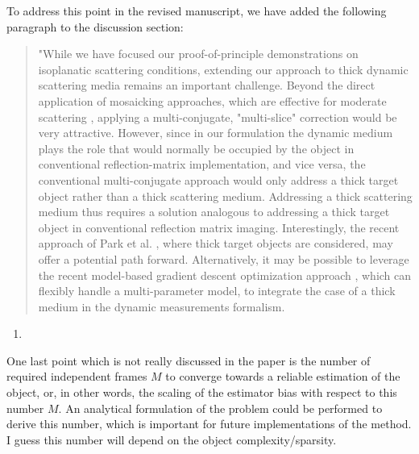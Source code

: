 \documentclass[12pt]{article}
\newenvironment{solved_reviewercomment}
    {\begin{tcolorbox}[width=\linewidth,colback=gray!5,colframe=solved_commentcolor!50,title=Reviewer Comment,left=5pt,right=5pt]}
    {\end{tcolorbox}}
\newenvironment{ourresponse}
    {\begin{tcolorbox}[width=\linewidth,breakable,enhanced,colback=gray!5,colframe=responsecolor!50,title=Response,left=5pt,right=5pt]}
    {\end{tcolorbox}}
\begin{document}
\begin{ourresponse}
    To address this point in the revised manuscript, we have added the following paragraph to the discussion section:
    \begin{quote}
        "While we have focused our proof-of-principle demonstrations on isoplanatic scattering conditions, extending our approach to thick dynamic scattering media remains an important challenge. Beyond the direct application of mosaicking approaches, which are effective for moderate scattering \cite{lee22, najar2024harnessing}, applying a multi-conjugate, "multi-slice" correction \cite{kang2023tracing, haim2025image} would be very attractive. However, since in our formulation the dynamic medium plays the role that would normally be occupied by the object in conventional reflection-matrix implementation, and vice versa, the conventional multi-conjugate approach would only address a thick target object rather than a thick scattering medium. Addressing a thick scattering medium thus requires a solution analogous to addressing a thick target object in conventional reflection matrix imaging. Interestingly, the recent approach of Park et al. \cite{oh2025digital}, where thick target objects are considered, may offer a potential path forward. 
        Alternatively, it may be possible to leverage the recent model-based gradient descent optimization approach  \cite{haim2025image}, which can flexibly handle a multi-parameter model, to integrate the case of a thick medium in the dynamic measurements formalism. 
    \end{quote}
    
\end{ourresponse}

\begin{enumerate}[label=\arabic*., resume]
\item \leavevmode
\end{enumerate}
\vspace{-1em}
\begin{solved_reviewercomment}
    One last point which is not really discussed in the paper is the number of required independent frames \(M\) to converge towards a reliable estimation of the object, or, in other words, the scaling of the estimator bias with respect to this number \(M\). An analytical formulation of the problem could be performed to derive this number, which is important for future implementations of the method. I guess this number will depend on the object complexity/sparsity.
\end{solved_reviewercomment}
    
\end{document}
